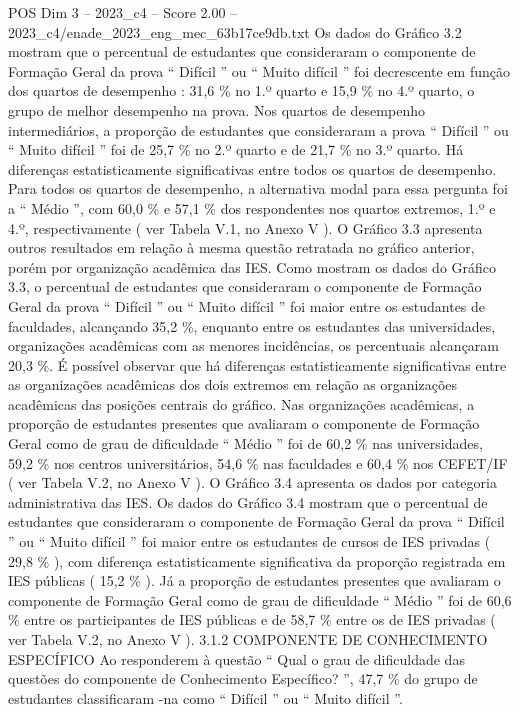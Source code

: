 \begin{textsample}{POS Dim 3 – 2023\_c4 – Score 2.00 – 2023\_c4/enade\_2023\_eng\_mec\_63b17ce9db.txt}
Os dados do Gráfico 3.2 mostram que o percentual de estudantes que consideraram o componente de Formação Geral da prova “ Difícil ” ou “ Muito difícil ” foi decrescente em função dos quartos de desempenho : 31,6 \% no 1.º quarto e 15,9 \% no 4.º quarto, o grupo de melhor desempenho na prova.
Nos quartos de desempenho intermediários, a proporção de estudantes que consideraram a prova “ Difícil ” ou “ Muito difícil ” foi de 25,7 \% no 2.º quarto e de 21,7 \% no 3.º quarto.
Há diferenças estatisticamente significativas entre todos os quartos de desempenho.
Para todos os quartos de desempenho, a alternativa modal para essa pergunta foi a “ Médio ”, com 60,0 \% e 57,1 \% dos respondentes nos quartos extremos, 1.º e 4.º, respectivamente ( ver Tabela V.1, no Anexo V ).
O Gráfico 3.3 apresenta outros resultados em relação à mesma questão retratada no gráfico anterior, porém por organização acadêmica das IES.
Como mostram os dados do Gráfico 3.3, o percentual de estudantes que consideraram o componente de Formação Geral da prova “ Difícil ” ou “ Muito difícil ” foi maior entre os estudantes de faculdades, alcançando 35,2 \%, enquanto entre os estudantes das universidades, organizações acadêmicas com as menores incidências, os percentuais alcançaram 20,3 \%.
É possível observar que há diferenças estatisticamente significativas entre as organizações acadêmicas dos dois extremos em relação as organizações acadêmicas das posições centrais do gráfico.
Nas organizações acadêmicas, a proporção de estudantes presentes que avaliaram o componente de Formação Geral como de grau de dificuldade “ Médio ” foi de 60,2 \% nas universidades, 59,2 \% nos centros universitários, 54,6 \% nas faculdades e 60,4 \% nos CEFET/IF ( ver Tabela V.2, no Anexo V ).
O Gráfico 3.4 apresenta os dados por categoria administrativa das IES.
Os dados do Gráfico 3.4 mostram que o percentual de estudantes que consideraram o componente de Formação Geral da prova “ Difícil ” ou “ Muito difícil ” foi maior entre os estudantes de cursos de IES privadas ( 29,8 \% ), com diferença estatisticamente significativa da proporção registrada em IES públicas ( 15,2 \% ).
Já a proporção de estudantes presentes que avaliaram o componente de Formação Geral como de grau de dificuldade “ Médio ” foi de 60,6 \% entre os participantes de IES públicas e de 58,7 \% entre os de IES privadas ( ver Tabela V.2, no Anexo V ). 3.1.2 COMPONENTE DE CONHECIMENTO ESPECÍFICO Ao responderem à questão “ Qual o grau de dificuldade das questões do componente de Conhecimento Específico? ”, 47,7 \% do grupo de estudantes classificaram -na como “ Difícil ” ou “ Muito difícil ”.

\end{textsample}
